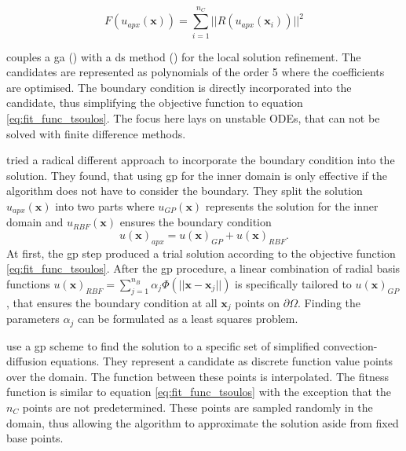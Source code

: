 \documentclass[./\jobname.tex]{subfiles}
\begin{document}
\begin{equation}
\label{eq:fit_func_tsoulos}
F(u_{apx}(\mathbf{x})) = \sum_{i=1}^{n_C} ||R(u_{apx}(\mathbf{x}_i))||^2
\end{equation} 

\cite{mastorakis_unstable_2006} couples a \gls{ga} (\cite{holland_outline_1962}) with a \gls{ds} method (\cite{nelder_simplex_1965}) for the local solution refinement. The candidates are represented as polynomials of the order 5 where the coefficients are optimised. The boundary condition is directly incorporated into the candidate, thus simplifying the objective function to equation \eqref{eq:fit_func_tsoulos}. The focus here lays on unstable ODEs, that can not be solved with finite difference methods. 

\cite{sobester_genetic_2008} tried a radical different approach to incorporate the boundary condition into the solution. They found, that using \gls{gp} for the inner domain is only effective if the algorithm does not have to consider the boundary. They split the solution $u_{apx}(\mathbf{x})$ into two parts where $u_{GP}(\mathbf{x})$ represents the solution for the inner domain and $u_{RBF}(\mathbf{x})$ ensures the boundary condition 
\begin{equation}
\label{eq:solution_sobester}
u(\mathbf{x})_{apx} = u(\mathbf{x})_{GP} + u(\mathbf{x})_{RBF}.
\end{equation}
At first, the \gls{gp} step produced a trial solution according to the objective function \eqref{eq:fit_func_tsoulos}. After the \gls{gp} procedure, a linear combination of radial basis functions $u(\mathbf{x})_{RBF} = \sum_{j=1}^{n_B} \alpha_j \Phi (||\mathbf{x}-\mathbf{x}_{j}||)$ is specifically tailored to $u(\mathbf{x})_{GP}$, that ensures the boundary condition at all $\mathbf{x}_{j}$ points on $\partial \Omega$. Finding the parameters $\alpha_j$ can be formulated as a least squares problem. 

\cite{howard_genetic_2011} use a \gls{gp} scheme to find the solution to a specific set of simplified convection-diffusion equations. They represent a candidate as discrete function value points over the domain. The function between these points is interpolated. The fitness function is similar to equation \eqref{eq:fit_func_tsoulos} with the exception that the $n_C$ points are not predetermined. These points are sampled randomly in the domain, thus allowing the algorithm to approximate the solution aside from fixed base points. 
\end{document}

